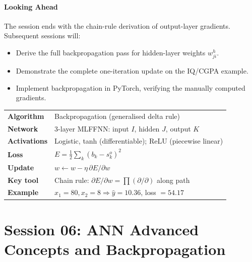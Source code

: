 \documentclass[12pt,a4paper]{article}
\newcommand{\yhat}{\hat{y}}
\begin{document}
\subsection*{Looking Ahead}

The session ends with the chain-rule derivation of output-layer gradients.
Subsequent sessions will:
\begin{itemize}
  \item Derive the full backpropagation pass for hidden-layer weights
    $w_{ji}^h$.
  \item Demonstrate the complete one-iteration update on the
    IQ/CGPA example.
  \item Implement backpropagation in PyTorch, verifying the manually
    computed gradients.
\end{itemize}

\vspace{1em}
\begin{tcolorbox}[colback=gray!5!white, colframe=gray!50!black,
                  title={\bfseries Session~05 -- Quick Reference Card}]
\begin{tabular}{ll}
\textbf{Algorithm} & Backpropagation (generalised delta rule) \\
\textbf{Network}   & 3-layer MLFFNN: input $I$, hidden $J$, output $K$ \\
\textbf{Activations} & Logistic, tanh (differentiable); ReLU (piecewise linear) \\
\textbf{Loss}      & $E = \tfrac{1}{2}\sum_k(b_k - s_k^o)^2$ \\
\textbf{Update}    & $w \leftarrow w - \eta\,\partial E/\partial w$ \\
\textbf{Key tool}  & Chain rule: $\partial E/\partial w = \prod (\partial/\partial)$ along path \\
\textbf{Example}   & $x_1=80, x_2=8 \Rightarrow \yhat=10.36$, loss $=54.17$ \\
\end{tabular}
\end{tcolorbox}

\clearpage

\part{Session 06: ANN Advanced Concepts and Backpropagation}
\end{document}
